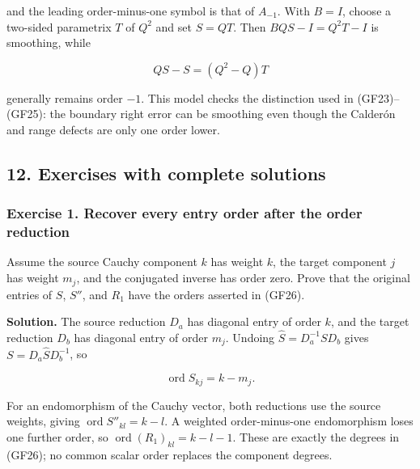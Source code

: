 \documentclass[
  11pt,
]{article}
\makeatletter
\let\ReaderOriginalAnchorStart\hyper@anchorstart
\let\ReaderOriginalAnchorEnd\hyper@anchorend
\let\ReaderPendingAliases\@empty
\def\ReaderArmAliases#1{\gdef\ReaderPendingAliases{#1}}
\def\hyper@anchorstart#1{\ReaderIfNativeAnchorTF{#1}{\ReaderPendingAliases\global\let\ReaderPendingAliases\@empty}{}\ReaderOriginalAnchorStart{#1}}
\makeatother
\begin{document}
and the leading order-minus-one symbol is that of \(A_{-1}\). With
\(B=I\), choose a two-sided parametrix \(T\) of \(Q^2\) and set
\(S=QT\). Then \(BQS-I=Q^2T-I\) is smoothing, while

\[
 QS-S=(Q^2-Q)T
 \tag{GF60}
\]

generally remains order \(-1\). This model checks the distinction used
in (GF23)--(GF25): the boundary right error can be smoothing even though
the Calderón and range defects are only one order lower.

\ReaderArmAliases{\ReaderOriginalAnchorStart{AN03-GCF-012}\ReaderOriginalAnchorEnd\begingroup\expandafter\def\csname @currentHref\endcsname{AN03-GCF-012}\label{AN03-GCF-012}\endgroup\ReaderOriginalAnchorStart{12-exercises-with-complete-solutions}\ReaderOriginalAnchorEnd\begingroup\expandafter\def\csname @currentHref\endcsname{12-exercises-with-complete-solutions}\label{12-exercises-with-complete-solutions}\endgroup\ReaderOriginalAnchorStart{exercises-with-complete-solutions}\ReaderOriginalAnchorEnd}
\subsection{12. Exercises with complete
solutions}\label{exercises-with-complete-solutions}

\subsubsection{Exercise 1. Recover every entry order after the order
reduction}\label{exercise-1.-recover-every-entry-order-after-the-order-reduction}

Assume the source Cauchy component \(k\) has weight \(k\), the target
component \(j\) has weight \(m_j\), and the conjugated inverse has order
zero. Prove that the original entries of \(S\), \(S''\), and \(R_1\)
have the orders asserted in (GF26).

\textbf{Solution.} The source reduction \(D_a\) has diagonal entry of
order \(k\), and the target reduction \(D_b\) has diagonal entry of
order \(m_j\). Undoing \(\widehat S=D_a^{-1}SD_b\) gives
\(S=D_a\widehat S D_b^{-1}\), so

\[
 \operatorname{ord}S_{kj}=k-m_j.
 \tag{GF61}
\]

For an endomorphism of the Cauchy vector, both reductions use the source
weights, giving \(\operatorname{ord}S''_{kl}=k-l\). A weighted
order-minus-one endomorphism loses one further order, so
\(\operatorname{ord}(R_1)_{kl}=k-l-1\). These are exactly the degrees in
(GF26); no common scalar order replaces the component degrees.
\end{document}
